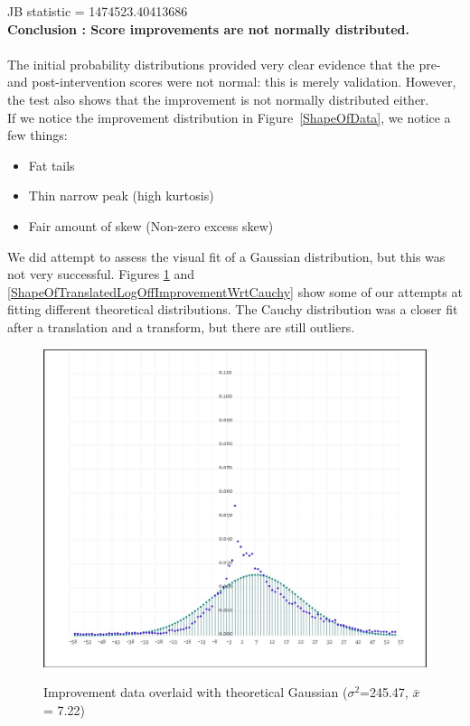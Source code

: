 \documentclass[10pt]{article}
\begin{document}
JB statistic = 1474523.40413686\\
\textbf{Conclusion : Score improvements are not normally distributed.}\\\\
The initial probability distributions provided very clear evidence that the pre- and post-intervention scores were not normal: this is merely validation. However, the test also shows that the improvement is not normally distributed either.\\
If we notice the improvement distribution in Figure~\ref{ShapeOfData}, we notice a few things:
\begin{itemize}
\item Fat tails
\item Thin narrow peak (high kurtosis)
\item Fair amount of skew (Non-zero excess skew)
\end{itemize}

We did attempt to assess the visual fit of a Gaussian distribution, but this was not very successful. Figures \ref{ShapeOfImprovementWrtNormal} and \ref{ShapeOfTranslatedLogOffImprovementWrtCauchy} show some of our attempts at fitting different theoretical distributions. The Cauchy distribution was a closer fit after a translation and a transform, but there are still outliers.
\begin{figure}
\caption{Improvement data overlaid with theoretical Gaussian (${\sigma}^2$=245.47, $\bar{x}$= 7.22)}
\label{ShapeOfImprovementWrtNormal}
\begin{center}
\includegraphics[width=120mm]{ReportMedia/ShapeOfImprovementWrtNormal.jpg}\\
\end{center}
\end{figure}
\end{document}
